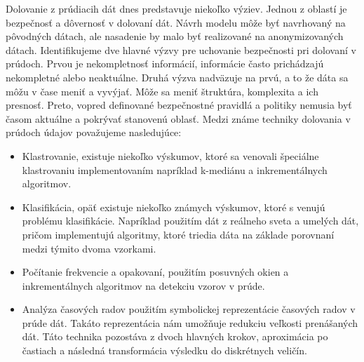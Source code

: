 Dolovanie z prúdiacih dát dnes predstavuje niekoľko výziev. Jednou z oblastí je bezpečnosť a dôvernosť v dolovaní dát. Návrh modelu môže byť navrhovaný na pôvodných dátach, ale nasadenie by malo byť realizované na anonymizovaných dátach. Identifikujeme dve hlavné výzvy pre uchovanie bezpečnosti pri dolovaní v prúdoch. Prvou je nekompletnosť informácií, informácie často prichádzajú nekompletné alebo neaktuálne. Druhá výzva nadväzuje na prvú, a to že dáta sa môžu v čase meniť a vyvýjať. Môže sa meniť štruktúra, komplexita a ich presnosť. Preto, vopred definované bezpečnostné pravidlá a politiky nemusia byť časom aktuálne a pokrývať stanovenú oblasť. Medzi známe techniky dolovania v prúdoch údajov považujeme nasledujúce:
 \par
\begin{itemize}
	\item Klastrovanie, existuje niekoľko výskumov, ktoré sa venovali špeciálne klastrovaniu implementovaním napríklad k-mediánu a inkrementálnych algoritmov.
	\item Klasifikácia, opäť existuje niekoľko známych výskumov, ktoré s venujú problému klasifikácie. Napríklad použitím dát z reálneho sveta a umelých dát, pričom implementujú algoritmy, ktoré triedia dáta na základe porovnaní medzi týmito dvoma vzorkami.
	\item Počítanie frekvencie a opakovaní, použitím posuvných okien a inkrementálnych algoritmov na detekciu vzorov v prúde.
	\item Analýza časových radov použitím symbolickej reprezentácie časových radov v prúde dát. Takáto reprezentácia nám umožňuje redukciu veľkosti prenášaných dát. Táto technika pozostáva z dvoch hlavných krokov, aproximácia po častiach a následná transformácia výsledku do diskrétnych veličín.
\end{itemize}


